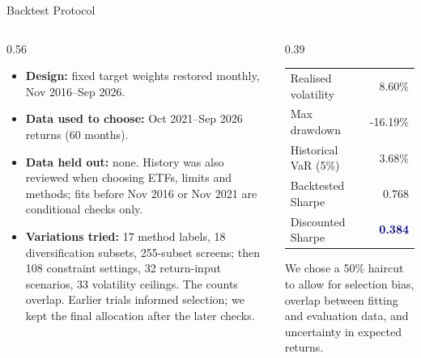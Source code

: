 \documentclass[aspectratio=169,11pt,t]{beamer}
\newcommand{\hd}[1]{\textcolor{navy}{\textbf{#1}}}
\newcommand{\tight}{\setlength{\itemsep}{0.45em}\setlength{\parskip}{0pt}}
\begin{document}
\begin{frame}{Backtest Protocol}
\vspace{0.5em}
\begin{columns}[T]
\begin{column}{0.56\textwidth}
\begin{itemize}\tight\footnotesize
\item \textbf{Design:} fixed target weights restored monthly, Nov 2016--Sep 2026.
\item \textbf{Data used to choose:} Oct 2021--Sep 2026 returns (60 months).
\item \textbf{Data held out:} none. History was also reviewed when choosing ETFs, limits and methods; fits before Nov 2016 or Nov 2021 are conditional checks only.
\item \textbf{Variations tried:} 17 method labels, 18 diversification subsets, 255-subset screens; then 108 constraint settings, 32 return-input scenarios, 33 volatility ceilings. The counts overlap. Earlier trials informed selection; we kept the final allocation after the later checks.
\end{itemize}
\end{column}
\begin{column}{0.39\textwidth}
\small
\renewcommand{\arraystretch}{1.2}
\begin{tabularx}{\linewidth}{@{}>{\raggedright\arraybackslash}X r@{}}
\toprule
Realised volatility & 8.60\%\\
Max drawdown & -16.19\%\\
Historical VaR (5\%) & 3.68\%\\
Backtested Sharpe & 0.768\\
Discounted Sharpe & \hd{0.384}\\
\bottomrule
\end{tabularx}
\vspace{0.4em}

\tiny{We chose a 50\% haircut to allow for selection bias, overlap between fitting and evaluation data, and uncertainty in expected returns.}
\end{column}
\end{columns}
\end{frame}
\end{document}
